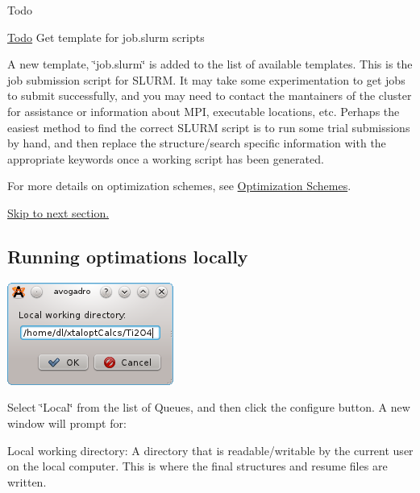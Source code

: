 \begin{DoxyRefDesc}{Todo}
\item[\hyperlink{todo__todo000003}{Todo}]Get template for job.\+slurm scripts\end{DoxyRefDesc}


A new template, \char`\"{}job.\+slurm\char`\"{} is added to the list of available templates. This is the job submission script for S\+L\+U\+R\+M. It may take some experimentation to get jobs to submit successfully, and you may need to contact the mantainers of the cluster for assistance or information about M\+P\+I, executable locations, etc. Perhaps the easiest method to find the correct S\+L\+U\+R\+M script is to run some trial submissions by hand, and then replace the structure/search specific information with the appropriate keywords once a working script has been generated.

For more details on optimization schemes, see \hyperlink{optschemes}{Optimization Schemes}.

\hyperlink{tut-xo_files}{Skip to next section.}\hypertarget{tut-xo_localqi}{}\subsection{Running optimations locally}\label{tut-xo_localqi}
 
\begin{DoxyImageNoCaption}
  \mbox{\includegraphics[width=\textwidth]{opt-set-local.png}}
\end{DoxyImageNoCaption}


Select \char`\"{}\+Local\char`\"{} from the list of Queues, and then click the configure button. A new window will prompt for\+:
\begin{DoxyItemize}
\item Local working directory\+: A directory that is readable/writable by the current user on the local computer. This is where the final structures and resume files are written.
\end{DoxyItemize}

